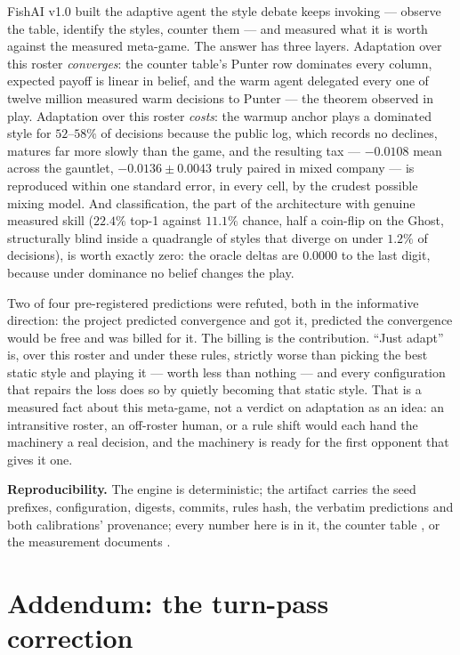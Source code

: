 \documentclass[11pt]{article}
\begin{document}
FishAI v1.0 built the adaptive agent the style debate keeps invoking --- observe the
table, identify the styles, counter them --- and measured what it is worth against the
measured meta-game. The answer has three layers. Adaptation over this roster
\emph{converges}: the counter table's Punter row dominates every column, expected payoff
is linear in belief, and the warm agent delegated every one of twelve million measured
warm decisions to Punter --- the theorem observed in play. Adaptation over this roster
\emph{costs}: the warmup anchor plays a dominated style for $52$--$58\%$ of decisions
because the public log, which records no declines, matures far more slowly than the game,
and the resulting tax --- $-0.0108$ mean across the gauntlet, $-0.0136 \pm 0.0043$ truly
paired in mixed company --- is reproduced within one standard error, in every cell, by
the crudest possible mixing model. And classification, the part of the architecture with
genuine measured skill ($22.4\%$ top-1 against $11.1\%$ chance, half a coin-flip on the
Ghost, structurally blind inside a quadrangle of styles that diverge on under $1.2\%$ of
decisions), is worth exactly zero: the oracle deltas are $0.0000$ to the last digit,
because under dominance no belief changes the play.

Two of four pre-registered predictions were refuted, both in the informative direction:
the project predicted convergence and got it, predicted the convergence would be free and
was billed for it. The billing is the contribution. ``Just adapt'' is, over this roster
and under these rules, strictly worse than picking the best static style and playing it
--- worth less than nothing --- and every configuration that repairs the loss does so by
quietly becoming that static style. That is a measured fact about this meta-game, not a
verdict on adaptation as an idea: an intransitive roster, an off-roster human, or a rule
shift would each hand the machinery a real decision, and the machinery is ready for the
first opponent that gives it one.

\medskip
\noindent\textbf{Reproducibility.} The engine is deterministic; the artifact
\cite{artifact} carries the seed prefixes, configuration, digests, commits, rules hash,
the verbatim predictions and both calibrations' provenance; every number here is in it,
the counter table \cite{matrixv2}, or the measurement documents \cite{rules,styles,botlab}.

\section{Addendum: the turn-pass correction}
\label{sec:addturnpass}
\end{document}
